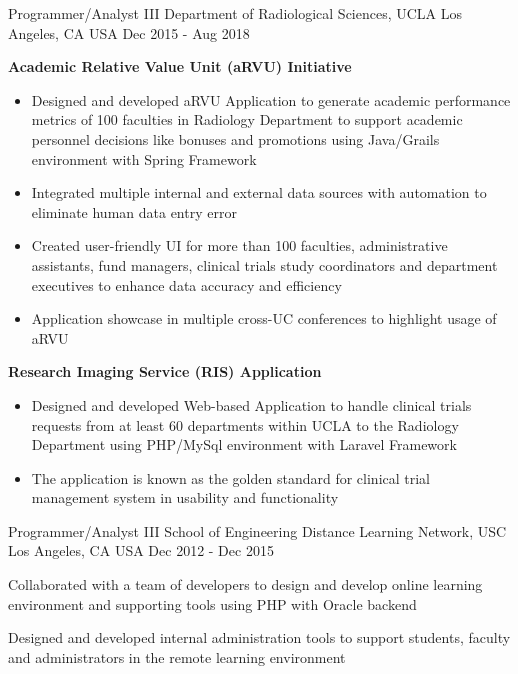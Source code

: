 \begin{cventries}
  \cventry
    {Programmer/Analyst III} %
    {Department of Radiological Sciences, UCLA} %
    {Los Angeles, CA USA} %
    {Dec 2015 - Aug 2018} %
    {
       \begin{cvitems} %
        \item[] { {\bf Academic Relative Value Unit (aRVU) Initiative} 
            \begin{itemize} %
                \item {Designed and developed aRVU Application to generate academic performance metrics of 100 faculties in Radiology Department to support academic personnel decisions like bonuses and promotions using Java/Grails environment with Spring Framework}
                \item {Integrated multiple internal and external data sources with automation to eliminate human data entry error}
                \item {Created user-friendly UI for more than 100 faculties, administrative assistants, fund managers, clinical trials study coordinators and department executives to enhance data accuracy and efficiency}
                \item {Application showcase in multiple cross-UC conferences to highlight usage of aRVU}
              \end{itemize}}
        \item[] {  {\bf Research Imaging Service (RIS) Application}  
            \begin{itemize} %
                \item {Designed and developed Web-based Application to handle clinical trials requests from at least 60 departments within UCLA to the Radiology Department using PHP/MySql environment with Laravel Framework}
                \item {The application is known as the golden standard for clinical trial management system in usability and functionality}
              \end{itemize}}
      \end{cvitems}
    }
	
  \cventry
    {Programmer/Analyst III} %
    {School of Engineering Distance Learning Network, USC} %
    {Los Angeles, CA USA} %
    {Dec 2012 - Dec 2015} %
    {
      \begin{cvitems} %
        \item {Collaborated with a team of developers to design and develop online learning environment and supporting tools using PHP with Oracle backend}
        \item {Designed and developed internal administration tools to support students, faculty and administrators  in the remote learning environment}       
      \end{cvitems}
    }


\end{cventries}
